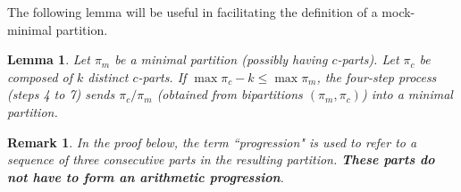 \documentclass[12pt,a4paper]{amsart}
\newtheorem{remark}{Remark}
\newtheorem{lemma}{Lemma}
\theoremstyle{definition}
\theoremstyle{notation}
\theoremstyle{corollary}
\begin{document}
The following lemma will be useful in facilitating the definition of a mock-minimal partition.

\begin{lemma}
Let $\pi_m$ be a minimal partition (possibly having $c$-parts). Let $\pi_c$ be composed of $k$ distinct $c$-parts. If $\max{\pi_c}-k\leq \max{\pi_m}$, the four-step process (steps 4 to 7) sends $\pi_c/\pi_m$ (obtained from bipartitions $(\pi_m,\pi_c)$) into a minimal partition.
\end{lemma}
\begin{remark}
In the proof below, the term ``progression" is used to refer to a sequence of three consecutive parts in the resulting partition. \textbf{These parts do not have to form an arithmetic progression}.
\end{remark}
\end{document}
